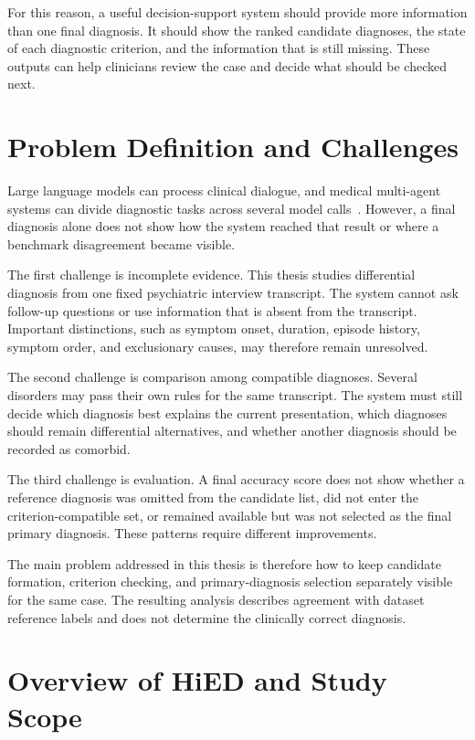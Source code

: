 \documentclass[12pt,a4paper,oneside]{report}
\begin{document}
For this reason, a useful decision-support system should provide more information than one final diagnosis. It should show the ranked candidate diagnoses, the state of each diagnostic criterion, and the information that is still missing. These outputs can help clinicians review the case and decide what should be checked next.

\section{Problem Definition and Challenges}
\label{sec:problem-definition}

Large language models can process clinical dialogue, and medical
multi-agent systems can divide diagnostic tasks across several model
calls~\citep{li2024taiwan,raballo2025,sarma2025,tang2024medagents,kim2024mdagents}.
However, a final diagnosis alone does not show how the system reached
that result or where a benchmark disagreement became visible.

The first challenge is incomplete evidence. This thesis studies
differential diagnosis from one fixed psychiatric interview transcript.
The system cannot ask follow-up questions or use information that is
absent from the transcript. Important distinctions, such as symptom
onset, duration, episode history, symptom order, and exclusionary causes,
may therefore remain unresolved.

The second challenge is comparison among compatible diagnoses. Several
disorders may pass their own rules for the same transcript. The system
must still decide which diagnosis best explains the current presentation,
which diagnoses should remain differential alternatives, and whether
another diagnosis should be recorded as comorbid.

The third challenge is evaluation. A final accuracy score does not show
whether a reference diagnosis was omitted from the candidate list, did
not enter the criterion-compatible set, or remained available but was
not selected as the final primary diagnosis. These patterns require
different improvements.

The main problem addressed in this thesis is therefore how to keep
candidate formation, criterion checking, and primary-diagnosis selection
separately visible for the same case. The resulting analysis describes
agreement with dataset reference labels and does not determine the
clinically correct diagnosis.

\section{Overview of HiED and Study Scope}
\end{document}
